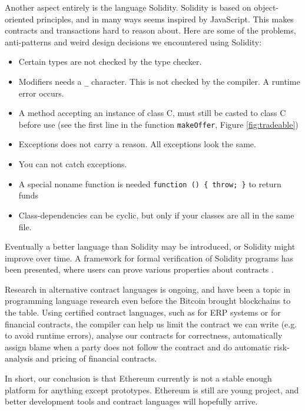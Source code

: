 \documentclass[oneside,a4paper,10pts,article]{memoir}
\begin{document}
Another aspect entirely is the language Solidity. Solidity is based on
object-oriented principles, and in many ways seems inspired by
JavaScript. This makes contracts and transactions hard to reason
about. Here are some of the problems, anti-patterns and weird design
decisions we encountered using Solidity:
\begin{itemize}
\item Certain types are not checked by the type checker. 
\item Modifiers needs a \texttt{\_} character. This is not checked by
  the compiler. A runtime error occurs.
\item A method accepting an instance of class C, must still be casted
  to class C before use (see the first line in the function
  \texttt{makeOffer}, Figure \ref{fig:tradeable})
\item Exceptions does not carry a reason. All exceptions look the same.
\item You can not catch exceptions.
\item A special noname function is needed \texttt{function () \{ throw; \}} to return funds
\item Class-dependencies can be cyclic, but only if your classes are
  all in the same file.
\end{itemize}

Eventually a better language than Solidity may be introduced, or
Solidity might improve over time. A framework for formal verification
of Solidity programs has been presented, where users can prove various
properties about contracts \cite{bhargavanshort}.

Research in alternative contract languages is ongoing, and have been a
topic in programming language research even before the Bitcoin brought
blockchains to the table. Using certified contract languages, such as
\cite{hvitved2011contract} for ERP systems or \cite{bahr2015certified}
for financial contracts, the compiler can help us limit the contract
we can write (e.g. to avoid runtime errors), analyse our contracts for
correctness, automatically assign blame when a party does not follow
the contract and do automatic risk-analysis and pricing of financial
contracts.

In short, our conclusion is that Ethereum currently is not a stable
enough platform for anything except prototypes. Ethereum is still are
young project, and better development tools and contract languages
will hopefully arrive.
\end{document}
